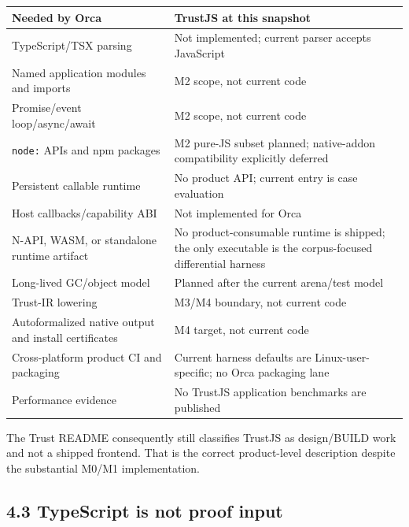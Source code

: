 \documentclass[
  10pt,
  letterpaper,
]{article}
\newcounter{none} %
\begin{document}
{\def\LTcaptype{none} %
\begin{longtable}[]{@{}
  >{\raggedright\arraybackslash}p{}
  >{\raggedright\arraybackslash}p{}@{}}
\toprule\noalign{}
\rowcolor{accent!12}
\begin{minipage}[b]{\linewidth}\raggedright
Needed by Orca
\end{minipage} & \begin{minipage}[b]{\linewidth}\raggedright
TrustJS at this snapshot
\end{minipage} \\
\midrule\noalign{}
\endhead
\bottomrule\noalign{}
\endlastfoot
TypeScript/TSX parsing & Not implemented; current parser accepts
JavaScript \\
Named application modules and imports & M2 scope, not current code \\
Promise/event loop/async/await & M2 scope, not current code \\
\texttt{node:} APIs and npm packages & M2 pure-JS subset planned;
native-addon compatibility explicitly deferred \\
Persistent callable runtime & No product API; current entry is case
evaluation \\
Host callbacks/capability ABI & Not implemented for Orca \\
N-API, WASM, or standalone runtime artifact & No product-consumable
runtime is shipped; the only executable is the corpus-focused
differential harness \\
Long-lived GC/object model & Planned after the current arena/test
model \\
Trust-IR lowering & M3/M4 boundary, not current code \\
Autoformalized native output and install certificates & M4 target, not
current code \\
Cross-platform product CI and packaging & Current harness defaults are
Linux-user-specific; no Orca packaging lane \\
Performance evidence & No TrustJS application benchmarks are
published \\
\end{longtable}
}

The Trust README consequently still classifies TrustJS as design/BUILD
work and not a shipped frontend. That is the correct product-level
description despite the substantial M0/M1 implementation.

\subsection{4.3 TypeScript is not proof
input}\label{43-typescript-is-not-proof-input}
\end{document}
